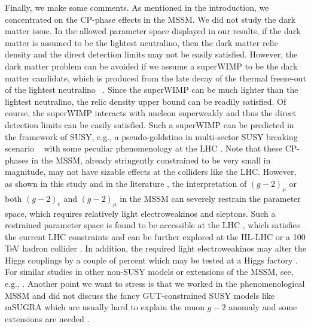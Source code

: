\documentclass[a4paper,11pt]{article}
\begin{document}
   Finally, we make some comments. 
   As mentioned in the introduction, we concentrated on the CP-phase effects in the MSSM. 
   We did not study the dark matter issue. In the allowed parameter space displayed in our results, if the dark matter is assumed to be the lightest neutralino, then the dark matter relic density and the direct detection limits may not be easily satisfied. However, the dark matter problem can be avoided if we assume a superWIMP to be the dark matter candidate, which is produced from the late decay of the thermal freeze-out of the lightest neutralino ~\cite{Feng:2003xh}. Since the superWIMP can be much lighter than the lightest neutralino, the relic density upper bound can be readily satisfied. Of course, the superWIMP interacts with nucleon superweakly and thus the direct detection limits can be easily satisfied. Such a superWIMP can be predicted in the framework of SUSY, e.g., a pseudo-goldstino in multi-sector SUSY breaking scenario ~\cite{Argurio:2011hs,Dai:2021eah} with some peculiar phenomenology at the LHC \cite{Liu:2014lda,Hikasa:2014yra}. 
     Note that these CP-phases in the MSSM, already stringently constrained to be very small in magnitude, may not have sizable effects at the colliders like the LHC. However, as shown in this study and in the literature \cite{Athron:2021iuf,Abdughani:2019wai,Li:2021koa,Cox:2018qyi,Badziak:2019gaf}, the interpretation of $(g-2)_{\mu}$ or both $(g-2)_e$ and $(g-2)_\mu$ in the MSSM can severely restrain the parameter space, which requires relatively light electroweakinos and sleptons. Such a restrained parameter space is found to be accessible at the LHC \cite{Athron:2021iuf,Abdughani:2019wai,Li:2021koa,Cox:2018qyi,Badziak:2019gaf}, which satisfies the current LHC constraints  and can be further explored at the HL-LHC \cite{Abdughani:2019wai} or a 100 TeV hadron collider \cite{Kobakhidze:2016mdx}. In addition, the required light electroweakinos may alter the Higgs couplings by a couple of 
   percent which may be tested at a Higgs factory \cite{Abdughani:2019wai}.
   For similar studies in other non-SUSY models or extensions of the MSSM, see, e.g., \cite{Sabatta:2019nfg,Zhu:2021vlz,Abdughani:2021pdc}. 
   Another point we want to stress is that we worked in the phenomenological MSSM and did not discuss the fancy GUT-constrained SUSY models like mSUGRA which are usually hard to explain the muon $g-2$ anomaly and some extensions are needed \cite{Wang:2021bcx,Li:2021pnt,Akula:2013ioa,Wang:2015rli,Wang:2018vrr,Han:2020exx}. 
   
\end{document}
